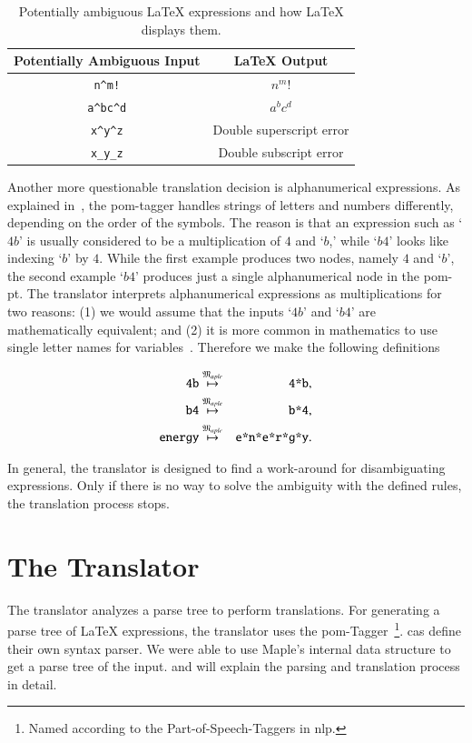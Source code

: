 \documentclass[a4paper,11pt]{article}
\newcommand{\Maple}{Maple}
\newcommand{\langMaple}{\mathfrak{M}_{aple}}
\theoremstyle{defTheoStyle}
\theoremstyle{defExampStyle}
\begin{document}
\begin{table}[ht]
\centering
\begin{tabular}{cc}
	\hline
	Potentially Ambiguous Input & \LaTeX{} Output\\
	\hline
	\verb|n^m!| & $n^m!$\\
	\verb|a^bc^d| & $a^bc^d$\\
	\verb|x^y^z| & Double superscript error\\
	\verb|x_y_z| & Double subscript error\\
	\hline
\end{tabular}
\caption{Potentially ambiguous \LaTeX{} expressions and how \LaTeX{} displays them.}
\label{tab:amb-latex}
\end{table}

Another more questionable translation decision is alphanumerical expressions. As explained in~, the \gls*{pom}-tagger handles strings of letters and numbers differently, depending on the order of the symbols. The reason is that an expression such as `$4b$' is usually considered to be a multiplication of $4$ and `$b$,' while `$b4$' looks like indexing `$b$' by $4$. While the first example produces two nodes, namely $4$ and `$b$', the second example `$b4$' produces just a single alphanumerical node in the \gls*{pom-pt}. The translator interprets alphanumerical expressions as multiplications for two reasons: (1) we would assume that the inputs `$4b$' and `$b4$' are mathematically equivalent; and (2) it is more common in mathematics to use single letter names for variables~\parencite{Notation:History}. Therefore we make the following definitions

\begin{eqnarray*}
\verb|4b| & \overset{\langMaple}{\mapsto} & \verb|4*b|,\\
\verb|b4| & \overset{\langMaple}{\mapsto} & \verb|b*4|,\\
\verb|energy| & \overset{\langMaple}{\mapsto} & \verb|e*n*e*r*g*y|.
\end{eqnarray*}

In general, the translator is designed to find a work-around for disambiguating expressions. Only if there is no way to solve the ambiguity with the defined rules, the translation process stops.

\section{The Translator}
The translator analyzes a parse tree to perform translations. For generating a parse tree of \LaTeX{} expressions, the translator uses the \gls*{pom}-Tagger~\parencite{POM-Tagger}\footnote{Named according to the Part-of-Speech-Taggers in \gls*{nlp}.}. \gls*{cas} define their own syntax parser. We were able to use \Maple's internal data structure to get a parse tree of the input.  and  will explain the parsing and translation process in detail.
\end{document}
